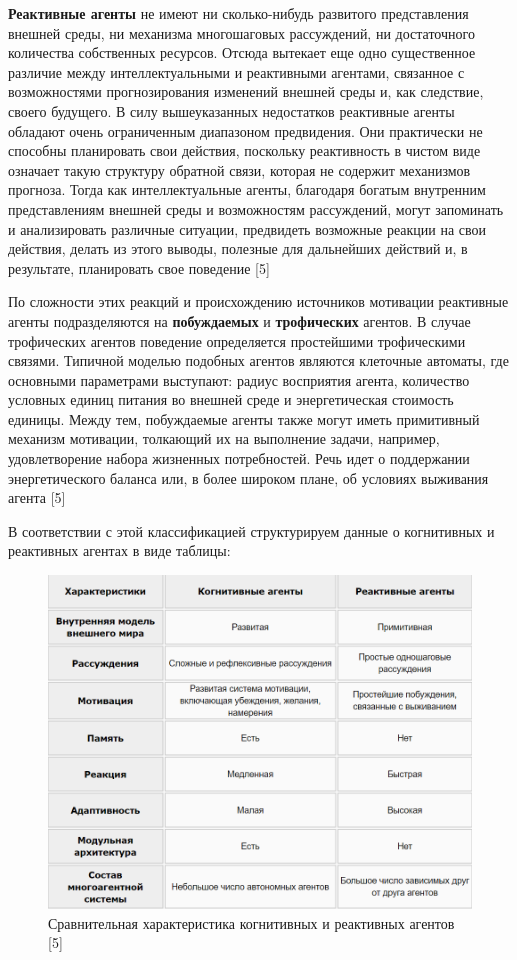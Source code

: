 \documentclass[14pt,a4paper,report]{report}
\begin{document}
\textbf{Реактивные агенты} не имеют ни сколько-нибудь развитого представления внешней среды, ни механизма многошаговых рассуждений, ни достаточного количества собственных ресурсов. Отсюда вытекает еще одно существенное различие между интеллектуальными и реактивными агентами, связанное с возможностями прогнозирования изменений внешней среды и, как следствие, своего будущего. В силу вышеуказанных недостатков реактивные агенты обладают очень ограниченным диапазоном предвидения. Они практически не способны планировать свои действия, поскольку реактивность в чистом виде означает такую структуру обратной связи, которая не содержит механизмов прогноза. Тогда как интеллектуальные агенты, благодаря богатым внутренним представлениям внешней среды и возможностям рассуждений, могут запоминать и анализировать различные ситуации, предвидеть возможные реакции на свои действия, делать из этого выводы, полезные для дальнейших действий и, в результате, планировать свое поведение [5]

По сложности этих реакций и происхождению источников мотивации реактивные агенты подразделяются на \textbf{побуждаемых} и \textbf{трофических} агентов. В случае трофических агентов поведение определяется простейшими трофическими связями. Типичной моделью подобных агентов являются клеточные автоматы, где основными параметрами выступают: радиус восприятия агента, количество условных единиц питания во внешней среде и энергетическая стоимость единицы. Между тем, побуждаемые агенты также могут иметь примитивный механизм мотивации, толкающий их на выполнение задачи, например, удовлетворение набора жизненных потребностей. Речь идет о поддержании энергетического баланса или, в более широком плане, об условиях выживания агента [5]

В соответствии с этой классификацией структурируем данные о когнитивных и реактивных агентах в виде таблицы:

\begin{figure}[h!]
	\centering
	\includegraphics[scale = 0.55]{images/0_2.png}
	\caption{Сравнительная характеристика когнитивных и реактивных агентов [5]}
\end{figure}
\end{document}
